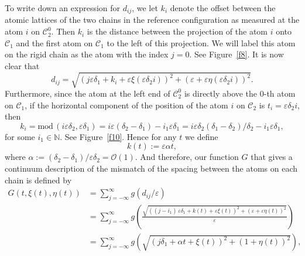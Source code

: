 \documentclass{siamltex}
\newcommand{\eps}{\varepsilon}
\begin{document}

To write down an expression for $d_{ij}$, we let $k_i$ denote the offset
between the atomic lattices of the two chains in the reference configuration as measured at the atom $i$ on
$\mathcal{C}_{2}^0$.  Then $k_i$ is the distance between the projection of
the atom $i$ onto $\mathcal{C}_{1}$ and the first atom on
$\mathcal{C}_{1}$ to the left of this projection.  We will label this atom on the rigid chain as the atom with the index $j=0$.
See Figure~\ref{f8}.  It is now clear that
%
\begin{equation}
  d_{ij}
  =
  \sqrt{\left(j\varepsilon\delta_{1}+k_i+\varepsilon\xi\left(\eps\delta_2i\right)\right)^{2}
  + \left(\varepsilon+\varepsilon\eta\left(\eps\delta_2i\right)\right)^{2}}.
  \label{ee15}
\end{equation}
%
Furthermore, since the atom at the left end of $\mathcal{C}_{2}^0$ is
directly above the $0$-th atom on $\mathcal{C}_{1}$, if the horizontal
component of the position
of the atom $i$ on $\mathcal{C}_{2}$ is $t_i= \varepsilon\delta_{2}
i$, then
%
\begin{equation}
  k_i
  =
  \text{mod}\,(i\varepsilon\delta_{2},\varepsilon\delta_{1})=i\varepsilon(\delta_{2}-\delta_{1})-i_1\varepsilon\delta_1
  = i\varepsilon\delta_{2}(\delta_{1}-\delta_{2})/\delta_{2}-i_1\varepsilon\delta_1,
  \label{ee4}
\end{equation}
%
for some $i_1\in\mathbb N$.
See Figure~\ref{f10}.
Hence for any $t$ we define 
%
\begin{equation}
   k(t) := \varepsilon\alpha t, \label{ee5}
\end{equation}
%
where $\alpha:=(\delta_{2}-\delta_{1})/\varepsilon\delta_{2}=\mathcal{O}(1)$. And therefore, our function $G$  that gives a
continuum description of the mismatch of the spacing between the atoms
on each chain is defined by
%
\begin{align}
	G(t,\xi(t),\eta(t))
        &=
        \sum_{j=-\infty}^{\infty}g(d_{ij}/\varepsilon) \nonumber \\
%
        &=
        \sum_{j=-\infty}^{\infty}
        g\left(
          \frac{\sqrt{((j-i_1)\,\varepsilon\delta_{1}+k(t)+\varepsilon\xi(t))^{2}
          + 
          (\varepsilon+\varepsilon\eta(t))^{2}}
          }{\varepsilon}\right) \label{ee8}\\
%
        &=
        \sum_{j=-\infty}^{\infty}
        g\left(
          \sqrt{(j\delta_{1}+\alpha t+\xi(t))^{2}
          + 
          (1+\eta(t))^{2}}
          \right), \nonumber 
\end{align}
\end{document}
